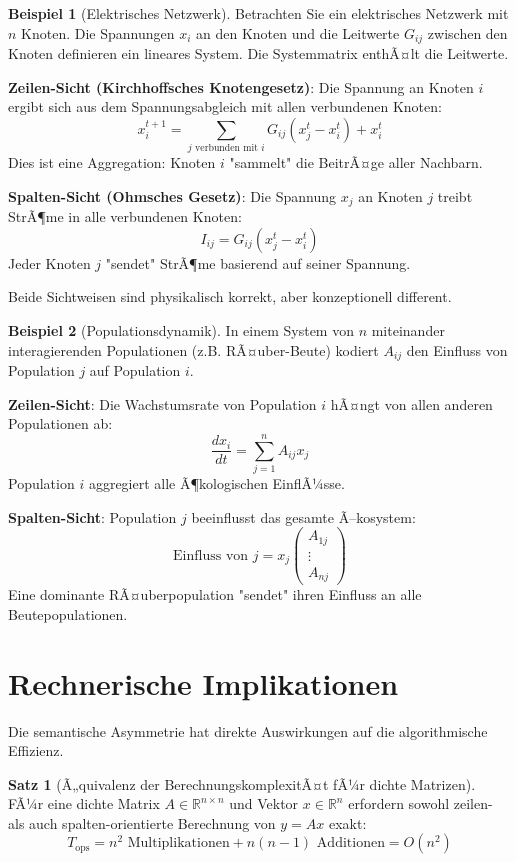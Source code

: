 ﻿\documentclass[a4paper,12pt]{report}
\theoremstyle{definition}
\newtheorem{beispiel}{Beispiel}
\newtheorem{satz}{Satz}
\begin{document}
	\begin{beispiel}[Elektrisches Netzwerk]
		Betrachten Sie ein elektrisches Netzwerk mit $n$ Knoten. Die Spannungen $x_i$ an den Knoten und die Leitwerte $G_{ij}$ zwischen den Knoten definieren ein lineares System. Die Systemmatrix enthÃ¤lt die Leitwerte.
		
		\textbf{Zeilen-Sicht (Kirchhoffsches Knotengesetz)}:
		Die Spannung an Knoten $i$ ergibt sich aus dem Spannungsabgleich mit allen verbundenen Knoten:
		\[
		x_i^{t+1} = \sum_{j \text{ verbunden mit } i} G_{ij} (x_j^t - x_i^t) + x_i^t
		\]
		Dies ist eine Aggregation: Knoten $i$ "sammelt" die BeitrÃ¤ge aller Nachbarn.
		
		\textbf{Spalten-Sicht (Ohmsches Gesetz)}:
		Die Spannung $x_j$ an Knoten $j$ treibt StrÃ¶me in alle verbundenen Knoten:
		\[
		I_{ij} = G_{ij}(x_j^t - x_i^t)
		\]
		Jeder Knoten $j$ "sendet" StrÃ¶me basierend auf seiner Spannung.
		
		Beide Sichtweisen sind physikalisch korrekt, aber konzeptionell different.
	\end{beispiel}
	
	\begin{beispiel}[Populationsdynamik]
		In einem System von $n$ miteinander interagierenden Populationen (z.B. RÃ¤uber-Beute) kodiert $A_{ij}$ den Einfluss von Population $j$ auf Population $i$.
		
		\textbf{Zeilen-Sicht}: Die Wachstumsrate von Population $i$ hÃ¤ngt von allen anderen Populationen ab:
		\[
		\frac{dx_i}{dt} = \sum_{j=1}^n A_{ij} x_j
		\]
		Population $i$ aggregiert alle Ã¶kologischen EinflÃ¼sse.
		
		\textbf{Spalten-Sicht}: Population $j$ beeinflusst das gesamte Ã–kosystem:
		\[
		\text{Einfluss von } j = x_j \begin{pmatrix} A_{1j} \\ \vdots \\ A_{nj} \end{pmatrix}
		\]
		Eine dominante RÃ¤uberpopulation "sendet" ihren Einfluss an alle Beutepopulationen.
	\end{beispiel}
	
	\section{Rechnerische Implikationen}
	
	Die semantische Asymmetrie hat direkte Auswirkungen auf die algorithmische Effizienz.
	
	\begin{satz}[Ã„quivalenz der BerechnungskomplexitÃ¤t fÃ¼r dichte Matrizen]
		FÃ¼r eine dichte Matrix $A \in \mathbb{R}^{n \times n}$ und Vektor $x \in \mathbb{R}^n$ erfordern sowohl zeilen- als auch spalten-orientierte Berechnung von $y = Ax$ exakt:
		\[
		T_{\text{ops}} = n^2 \text{ Multiplikationen} + n(n-1) \text{ Additionen} = O(n^2)
		\]
	\end{satz}
	
\end{document}
